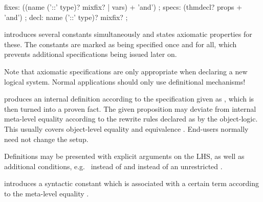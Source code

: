 \begin{isabellebody}
\begin{isamarkuptext}
\begin{rail}
    fixes: ((name ('::' type)? mixfix? | vars) + 'and')
    ;
    specs: (thmdecl? props + 'and')
    ;
    decl: name ('::' type)? mixfix?
    ;
  \end{rail}

  \begin{descr}
  
  \item [\mbox{\isa{\isacommand{axiomatization}}}~\isa{{\isachardoublequote}c\isactrlsub {\isadigit{1}}\ {\isasymdots}\ c\isactrlsub m\ {\isasymWHERE}\ {\isasymphi}\isactrlsub {\isadigit{1}}\ {\isasymdots}\ {\isasymphi}\isactrlsub n{\isachardoublequote}}] introduces several constants
  simultaneously and states axiomatic properties for these.  The
  constants are marked as being specified once and for all, which
  prevents additional specifications being issued later on.
  
  Note that axiomatic specifications are only appropriate when
  declaring a new logical system.  Normal applications should only use
  definitional mechanisms!

  \item [\mbox{\isa{\isacommand{definition}}}~\isa{{\isachardoublequote}c\ {\isasymWHERE}\ eq{\isachardoublequote}}] produces an
  internal definition  according to the specification
  given as , which is then turned into a proven fact.  The
  given proposition may deviate from internal meta-level equality
  according to the rewrite rules declared as \mbox{} by the
  object-logic.  This usually covers object-level equality  and equivalence .  End-users normally need not
  change the \mbox{} setup.
  
  Definitions may be presented with explicit arguments on the LHS, as
  well as additional conditions, e.g.\  instead of
   and  instead of an
  unrestricted .
  
  \item [\mbox{\isa{\isacommand{abbreviation}}}~\isa{{\isachardoublequote}c\ {\isasymWHERE}\ eq{\isachardoublequote}}] introduces
  a syntactic constant which is associated with a certain term
  according to the meta-level equality .
  

\end{descr}
\end{isamarkuptext}
\end{isabellebody}
